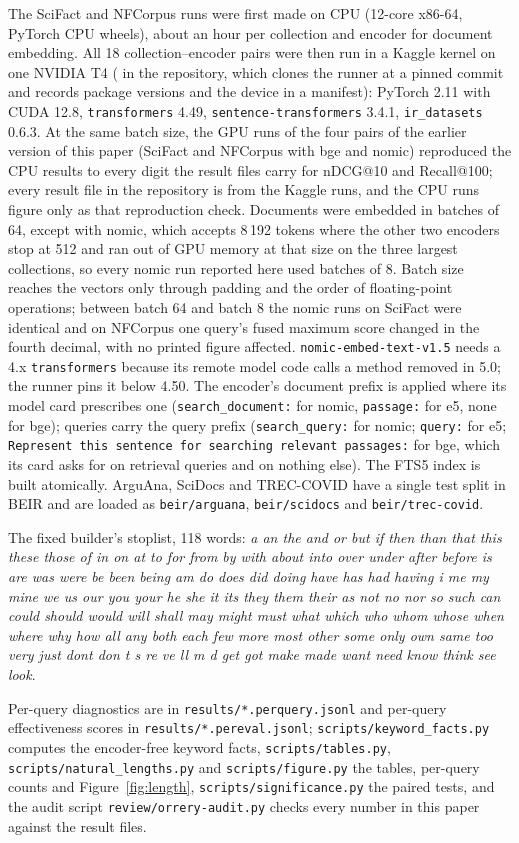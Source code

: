 \documentclass[11pt]{article}
\begin{document}
The SciFact and NFCorpus runs were first made on CPU (12-core x86-64, PyTorch CPU wheels), about an hour per collection and encoder for document embedding. All 18 collection--encoder pairs were then run in a Kaggle kernel on one NVIDIA T4 ( in the repository, which clones the runner at a pinned commit and records package versions and the device in a manifest): PyTorch 2.11 with CUDA 12.8, \texttt{transformers} 4.49, \texttt{sentence-transformers} 3.4.1, \texttt{ir\_datasets} 0.6.3. At the same batch size, the GPU runs of the four pairs of the earlier version of this paper (SciFact and NFCorpus with bge and nomic) reproduced the CPU results to every digit the result files carry for nDCG@10 and Recall@100; every result file in the repository is from the Kaggle runs, and the CPU runs figure only as that reproduction check. Documents were embedded in batches of 64, except with nomic, which accepts 8\,192 tokens where the other two encoders stop at 512 and ran out of GPU memory at that size on the three largest collections, so every nomic run reported here used batches of 8. Batch size reaches the vectors only through padding and the order of floating-point operations; between batch 64 and batch 8 the nomic runs on SciFact were identical and on NFCorpus one query's fused maximum score changed in the fourth decimal, with no printed figure affected. \texttt{nomic-embed-text-v1.5} needs a 4.x \texttt{transformers} because its remote model code calls a method removed in 5.0; the runner pins it below 4.50. The encoder's document prefix is applied where its model card prescribes one (\texttt{search\_document:} for nomic, \texttt{passage:} for e5, none for bge); queries carry the query prefix (\texttt{search\_query:} for nomic; \texttt{query:} for e5; \texttt{Represent this sentence for searching relevant passages:} for bge, which its card asks for on retrieval queries and on nothing else). The FTS5 index is built atomically. ArguAna, SciDocs and TREC-COVID have a single test split in BEIR and are loaded as \texttt{beir/arguana}, \texttt{beir/scidocs} and \texttt{beir/trec-covid}.

The fixed builder's stoplist, 118 words: \emph{a an the and or but if then than that this these those of in on at to for from by with about into over under after before is are was were be been being am do does did doing have has had having i me my mine we us our you your he she it its they them their as not no nor so such can could should would will shall may might must what which who whom whose when where why how all any both each few more most other some only own same too very just dont don t s re ve ll m d get got make made want need know think see look}.

Per-query diagnostics are in \texttt{results/*.perquery.jsonl} and per-query effectiveness scores in \texttt{results/*.pereval.jsonl}; \texttt{scripts/keyword\_facts.py} computes the encoder-free keyword facts, \texttt{scripts/tables.py}, \texttt{scripts/natural\_lengths.py} and \texttt{scripts/figure.py} the tables, per-query counts and Figure~\ref{fig:length}, \texttt{scripts/significance.py} the paired tests, and the audit script \texttt{review/orrery-audit.py} checks every number in this paper against the result files.
\end{document}
